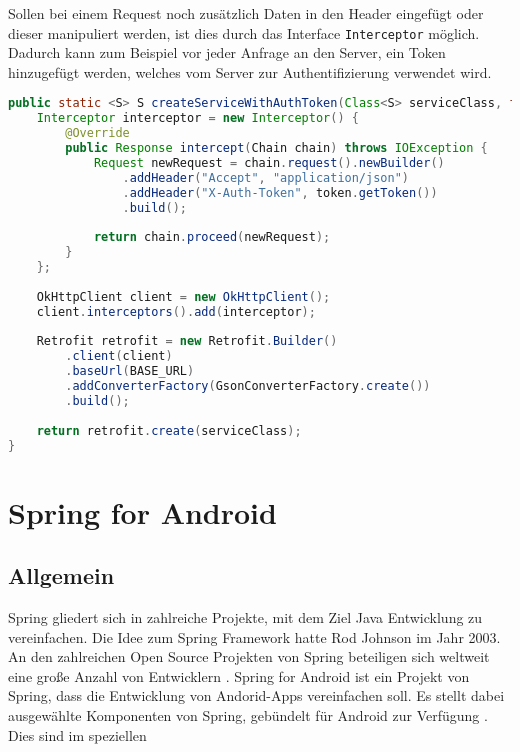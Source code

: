 \newpage
Sollen bei einem Request noch zusätzlich Daten in den Header eingefügt oder dieser manipuliert werden, ist dies durch das Interface \texttt{Interceptor} möglich. Dadurch kann zum Beispiel vor jeder Anfrage an den Server, ein Token hinzugefügt werden, welches vom Server zur Authentifizierung verwendet wird.

\begin{lstlisting}[language=java, caption={Hinzufügen des Tokens, für gültigen Login},label={lst:addToken}, escapechar=|, frame=single]
public static <S> S createServiceWithAuthToken(Class<S> serviceClass, final AuthToken token) {
	Interceptor interceptor = new Interceptor() {
		@Override
		public Response intercept(Chain chain) throws IOException {
			Request newRequest = chain.request().newBuilder()
				.addHeader("Accept", "application/json")
				.addHeader("X-Auth-Token", token.getToken())
				.build();
		
			return chain.proceed(newRequest);
		}
	};
		
	OkHttpClient client = new OkHttpClient();
	client.interceptors().add(interceptor);
		
	Retrofit retrofit = new Retrofit.Builder()
		.client(client)
		.baseUrl(BASE_URL)
		.addConverterFactory(GsonConverterFactory.create())
		.build();
	
	return retrofit.create(serviceClass);
}
\end{lstlisting}

\newpage
\section{Spring for Android}

\subsection{Allgemein}
Spring gliedert sich in zahlreiche Projekte, mit dem Ziel Java Entwicklung zu vereinfachen. Die Idee zum Spring Framework hatte Rod Johnson im Jahr 2003. An den zahlreichen Open Source Projekten von Spring  beteiligen sich weltweit eine große Anzahl von Entwicklern \cite{springITWissen}. Spring for Android ist ein Projekt von Spring, dass die Entwicklung von Andorid-Apps vereinfachen soll. Es stellt dabei ausgewählte Komponenten von Spring, gebündelt für Android zur Verfügung \cite{springForAndroid:website}. Dies sind im speziellen 

